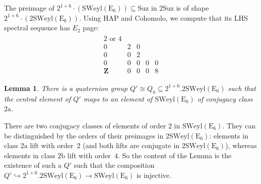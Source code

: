 \documentclass[pdftex]{sigma}
\numberwithin{equation}{section}
\newtheorem{Lemma}[Theorem]{Lemma}
\newcommand\bZ{\mathbf Z}
\newcommand\ra{\mathrm a}
\newcommand\rb{\mathrm b}
\newcommand\rE{\mathrm E}
\newcommand\mono\hookrightarrow
\newcommand\<\langle
\renewcommand\>\rangle
\newcommand\Suz{\mathrm{Suz}}
\newcommand\SWeyl{\mathrm{SWeyl}}
\begin{document}
The preimage of
{$2^{1+6}\cdot(\SWeyl(\rE_6)) \subseteq \Suz$}
 in $2\Suz$ is of shape $2^{1+6}\cdot(2\SWeyl(\rE_6))$. Using HAP and Cohomolo, we compute that its LHS spectral sequence has $E_2$ page:
\begin{gather*} \begin{array}{ccccc}
2 \text{ or } 4 \\
0 & 2 & 0 \\
0 & 0 & 2 \\
0 & 0 & 0 & 0 & 0 \\
\bZ & 0 & 0 & 0 & 8
\end{array} \end{gather*}

\begin{Lemma}\label{suzlemma-lifingQ8} There is a quaternion group $Q' \cong Q_8 \subseteq 2^{1+6}.2\SWeyl (\rE_6)$ such that the central element of $Q'$ maps to an element of $\SWeyl(\rE_6)$ of conjugacy class~$2\ra$.
\end{Lemma}

There are two conjugacy classes of elements of order $2$ in $\SWeyl (\rE_6)$. They can be distinguished by the orders of their preimages in $2\SWeyl (\rE_6)$: elements in class $2\ra$ lift with order~$2$ (and both lifts are conjugate in $2\SWeyl(\rE_6)$), whereas elements in class $2\rb$ lift with order~$4$. So the content of the Lemma is the existence of such a $Q'$ such that the composition $Q' \mono 2^{1+6}.2\SWeyl (\rE_6) \to \SWeyl (\rE_6)$ is injective.
\end{document}
